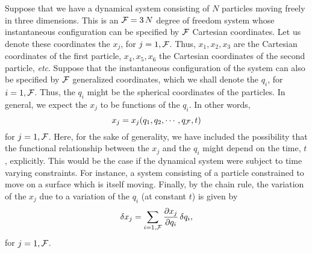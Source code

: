 Suppose that we have a dynamical system consisting of $N$ particles
moving freely in three dimensions. This is an ${\cal F}= 3\,N$ degree of
freedom system whose instantaneous configuration can be specified
by ${\cal F}$ Cartesian coordinates. Let us denote these coordinates the
$x_j$, for $j=1,{\cal F}$. Thus, $x_1, x_2, x_3$ are the Cartesian coordinates
of the first particle, $x_4, x_5, x_6$  the Cartesian coordinates
of the second particle, {\em etc}. Suppose that the instantaneous configuration of the system can also be specified by ${\cal F}$ generalized
coordinates, which we shall denote the $q_i$, for $i=1,{\cal F}$. Thus, the
$q_i$ might be the spherical coordinates of the particles.
 In general,
we expect the $x_j$ to be functions of the $q_i$. In other words,
\begin{equation}
x_j = x_j(q_1,q_2,\cdots,q_{\cal F}, t)
\end{equation}
for $j=1,{\cal F}$. Here, for the sake of generality, we have included the
possibility that the functional relationship between the $x_j$ and the
$q_i$ might depend on the time, $t$, explicitly. This would be the
case if the dynamical system were subject to time varying constraints. For
instance, a system consisting of a particle constrained to move on a surface which is itself
moving. Finally, by the chain rule, the variation of the $x_j$ due to a variation of the $q_i$
(at constant $t$) is given by
\begin{equation}\label{e10.2}
\delta x_j = \sum_{i=1,{\cal F}} \frac{\partial x_j}{\partial q_i}\,\delta q_i,
\end{equation}
for $j=1,{\cal F}$. 

